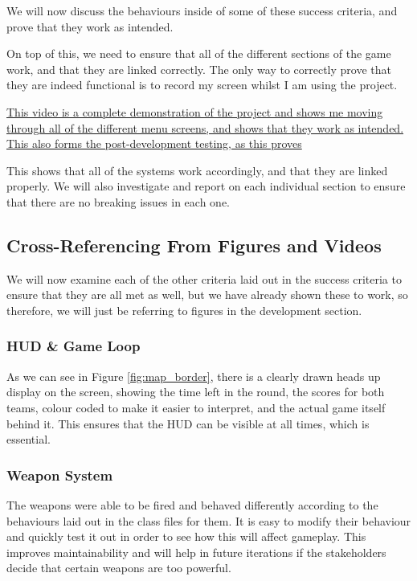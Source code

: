 We will now discuss the behaviours inside of some of these success criteria, and prove that they work as intended.

\vs
On top of this, we need to ensure that all of the different sections of the game work, and that they are linked correctly. The only way to correctly prove that they are indeed functional is to record my screen whilst I am using the project.

\vs

\href{https://youtu.be/9JaKmo6fSd0}{This video is a complete demonstration of the project and shows me moving through all of the different menu screens, and shows that they work as intended. This also forms the post-development testing, as this proves }

\vs
This shows that all of the systems work accordingly, and that they are linked properly. We will also investigate and report on each individual section to ensure that there are no breaking issues in each one.



\vs
\subsection{Cross-Referencing From Figures and Videos}

We will now examine each of the other criteria laid out in the success criteria to ensure that they are all met as well, but we have already shown these to work, so therefore, we will just be referring to figures in the development section.

\subsubsection{HUD \& Game Loop}

\vs
As we can see in Figure \ref{fig:map_border}, there is a clearly drawn heads up display on the screen, showing the time left in the round, the scores for both teams, colour coded to make it easier to interpret, and the actual game itself behind it. This ensures that the HUD can be visible at all times, which is essential.

\subsubsection{Weapon System}

The weapons were able to be fired and behaved differently according to the behaviours laid out in the class files for them. It is easy to modify their behaviour and quickly test it out in order to see how this will affect gameplay. This improves maintainability and will help in future iterations if the stakeholders decide that certain weapons are too powerful.

